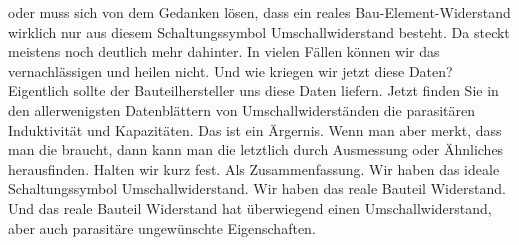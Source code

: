 \begin{frame}
{oder muss sich von dem Gedanken lösen, dass ein reales Bau-Element-Widerstand wirklich nur aus diesem Schaltungssymbol Umschallwiderstand besteht. Da steckt meistens noch deutlich mehr dahinter. In vielen Fällen können wir das vernachlässigen und heilen nicht. Und wie kriegen wir jetzt diese Daten? Eigentlich sollte der Bauteilhersteller uns diese Daten liefern. Jetzt finden Sie in den allerwenigsten Datenblättern von Umschallwiderständen die parasitären Induktivität und Kapazitäten. Das ist ein Ärgernis. Wenn man aber merkt, dass man die braucht, dann kann man die letztlich durch Ausmessung oder Ähnliches herausfinden. Halten wir kurz fest. Als Zusammenfassung. Wir haben das ideale Schaltungssymbol Umschallwiderstand. Wir haben das reale Bauteil Widerstand. Und das reale Bauteil Widerstand hat überwiegend einen Umschallwiderstand, aber auch parasitäre ungewünschte Eigenschaften.
		
	}
	
\end{frame}

